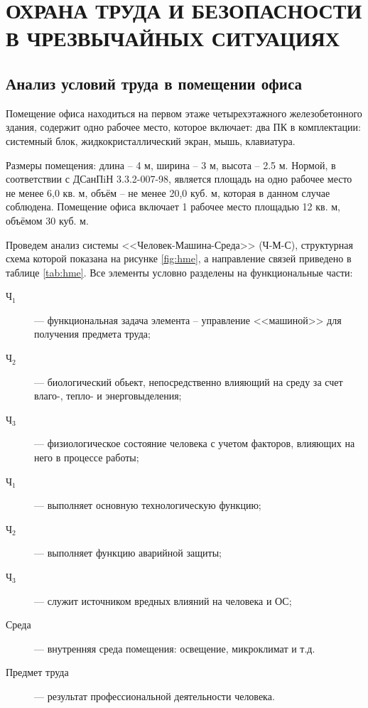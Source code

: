 \section{ОХРАНА ТРУДА И БЕЗОПАСНОСТИ В ЧРЕЗВЫЧАЙНЫХ СИТУАЦИЯХ}

\subsection{Анализ условий труда в помещении офиса}

Помещение офиса находиться на первом этаже четырехэтажного железобетонного здания,
содержит одно рабочее место, которое включает: 
два ПК в комплектации: системный блок, жидкокристаллический экран, мышь, клавиатура.

Размеры помещения: длина -- 4 м, ширина -- 3 м, высота -- 2.5 м. Нормой, в соответствии с ДСанПiН 3.3.2-007-98, 
является площадь на одно рабочее место не менее 6,0 кв. м, объём -- не менее 20,0 куб. м, которая в данном случае
соблюдена. Помещение офиса включает 1 рабочее место площадью 12 кв. м, объёмом 30 куб. м.

Проведем анализ системы <<Человек-Машина-Среда>> (Ч-М-С), структурная схема которой показана на рисунке 
\ref{fig:hme},
а направление связей приведено в таблице \ref{tab:hme}. Все элементы условно разделены на функциональные части:

\begin{description}
    \item [\(\text{Ч}_1\)] --- функциональная задача элемента -- управление <<машиной>> для получения предмета труда;
    \item [\(\text{Ч}_2\)] --- биологический обьект, непосредственно влияющий на среду за счет влаго-, тепло- и энерговыделения;
    \item [\(\text{Ч}_3\)] --- физиологическое состояние человека с учетом факторов, влияющих на него в процессе работы;
    \item [\(\text{Ч}_1\)] --- выполняет основную технологическую функцию;
    \item [\(\text{Ч}_2\)] --- выполняет функцию аварийной защиты;
    \item [\(\text{Ч}_3\)] --- служит источником вредных влияний на человека и ОС;
    \item [\(\text{Среда}\)] --- внутренняя среда помещения: освещение, микроклимат и т.д.
    \item [\(\text{Предмет труда}\)] --- результат профессиональной деятельности человека.
\end{description}

